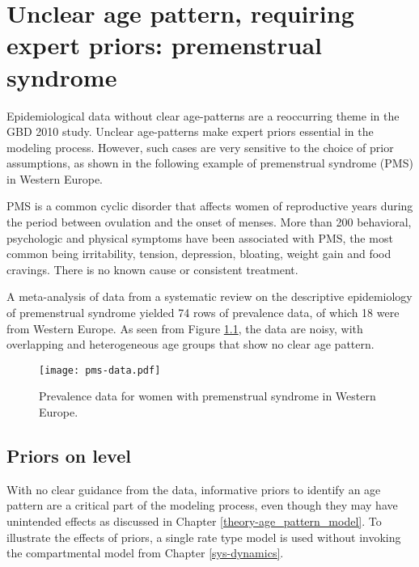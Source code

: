 \chapter{Unclear age pattern, requiring expert priors: premenstrual syndrome}
\label{applications-priors_knots_select}

Epidemiological data without clear age-patterns are a reoccurring
theme in the GBD 2010 study.  Unclear age-patterns make expert priors
essential in the modeling process.  However, such cases are very
sensitive to the choice of prior assumptions, as shown in the
following example of premenstrual syndrome (PMS) in Western Europe.

PMS is a common cyclic disorder that affects women of reproductive
years during the period between ovulation and the onset of menses.
More than 200 behavioral, psychologic and physical symptoms have been
associated with PMS, the most common being irritability, tension,
depression, bloating, weight gain and food cravings.  There is no
known cause or consistent
treatment. \cite{dickerson_premenstrual_2003, singh_incidence_1998,
  goodale_alleviation_1990}

A meta-analysis of data from a systematic review on the descriptive
epidemiology of premenstrual syndrome yielded 74 rows of prevalence
data, of which 18 were from Western Europe.  As seen from Figure
\ref{fig:app-pms_data}, the data are noisy, with overlapping and
heterogeneous age groups that show no clear age pattern.

    \begin{figure}[h]
        \begin{center}
            \texttt{[image: pms-data.pdf]}
            \caption{Prevalence data for women with premenstrual
              syndrome in Western Europe.}
        \end{center}
        \label{fig:app-pms_data}
    \end{figure}

\section{Priors on level} \label{sec:app-priors on level}
With no clear guidance from the data, informative priors to identify
an age pattern are a critical part of the modeling process, even
though they may have unintended effects as discussed in Chapter
\ref{theory-age_pattern_model}.  To illustrate the effects of priors,
a single rate type model is used without invoking the compartmental
model from Chapter \ref{sys-dynamics}.

